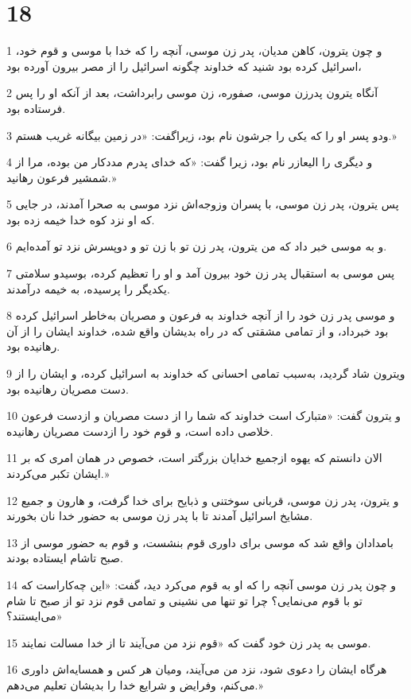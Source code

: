 \chapter{18}

\par 1 و چون یترون، کاهن مدیان، پدر زن موسی، آنچه را که خدا با موسی و قوم خود، اسرائیل کرده بود شنید که خداوند چگونه اسرائیل را از مصر بیرون آورده بود،
\par 2 آنگاه یترون پدرزن موسی، صفوره، زن موسی رابرداشت، بعد از آنکه او را پس فرستاده بود.
\par 3 ودو پسر او را که یکی را جرشون نام بود، زیراگفت: «در زمین بیگانه غریب هستم.»
\par 4 و دیگری را الیعازر نام بود، زیرا گفت: «که خدای پدرم مددکار من بوده، مرا از شمشیر فرعون رهانید.»
\par 5 پس یترون، پدر زن موسی، با پسران وزوجه‌اش نزد موسی به صحرا آمدند، در جایی که او نزد کوه خدا خیمه زده بود.
\par 6 و به موسی خبر داد که من یترون، پدر زن تو با زن تو و دوپسرش نزد تو آمده‌ایم.
\par 7 پس موسی به استقبال پدر زن خود بیرون آمد و او را تعظیم کرده، بوسیدو سلامتی یکدیگر را پرسیده، به خیمه درآمدند.
\par 8 و موسی پدر زن خود را از آنچه خداوند به فرعون و مصریان به‌خاطر اسرائیل کرده بود خبرداد، و از تمامی مشقتی که در راه بدیشان واقع شده، خداوند ایشان را از آن رهانیده بود.
\par 9 ویترون شاد گردید، به‌سبب تمامی احسانی که خداوند به اسرائیل کرده، و ایشان را از دست مصریان رهانیده بود.
\par 10 و یترون گفت: «متبارک است خداوند که شما را از دست مصریان و ازدست فرعون خلاصی داده است، و قوم خود را ازدست مصریان رهانیده.
\par 11 الان دانستم که یهوه ازجمیع خدایان بزرگتر است، خصوص در همان امری که بر ایشان تکبر می‌کردند.»
\par 12 و یترون، پدر زن موسی، قربانی سوختنی و ذبایح برای خدا گرفت، و هارون و جمیع مشایخ اسرائیل آمدند تا با پدر زن موسی به حضور خدا نان بخورند.
\par 13 بامدادان واقع شد که موسی برای داوری قوم بنشست، و قوم به حضور موسی از صبح تاشام ایستاده بودند.
\par 14 و چون پدر زن موسی آنچه را که او به قوم می‌کرد دید، گفت: «این چه‌کاراست که تو با قوم می‌نمایی؟ چرا تو تنها می نشینی و تمامی قوم نزد تو از صبح تا شام می‌ایستند؟»
\par 15 موسی به پدر زن خود گفت که «قوم نزد من می‌آیند تا از خدا مسالت نمایند.
\par 16 هرگاه ایشان را دعوی شود، نزد من می‌آیند، ومیان هر کس و همسایه‌اش داوری می‌کنم، وفرایض و شرایع خدا را بدیشان تعلیم می‌دهم.»
